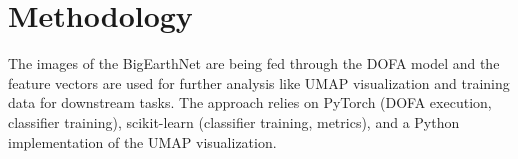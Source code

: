 \section{Methodology}
\label{sec:methodology}

The images of the BigEarthNet are being fed through the DOFA model and the feature vectors are used for further analysis like UMAP visualization and training data for downstream tasks. The approach relies on PyTorch (DOFA execution, classifier training), scikit-learn (classifier training, metrics), and a Python implementation of the UMAP visualization.